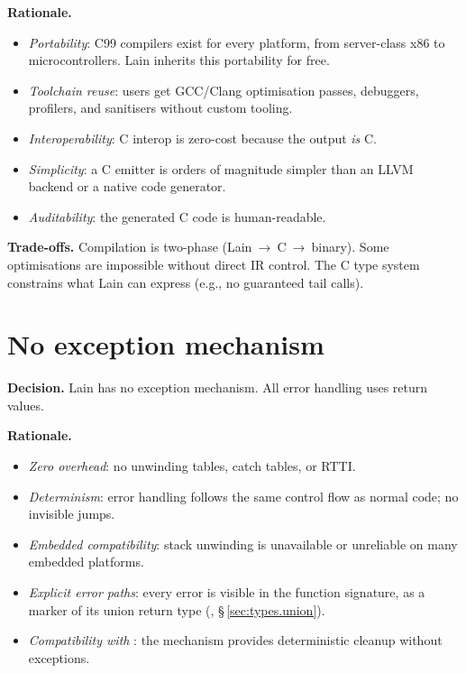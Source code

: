\pnum
\textbf{Rationale.}
\begin{itemize}
  \item \textit{Portability}: C99 compilers exist for every platform,
        from server-class x86 to microcontrollers.  Lain inherits this
        portability for free.
  \item \textit{Toolchain reuse}: users get GCC/Clang optimisation passes,
        debuggers, profilers, and sanitisers without custom tooling.
  \item \textit{Interoperability}: C interop is zero-cost because the
        output \emph{is} C.
  \item \textit{Simplicity}: a C emitter is orders of magnitude simpler
        than an LLVM backend or a native code generator.
  \item \textit{Auditability}: the generated C code is human-readable.
\end{itemize}

\pnum
\textbf{Trade-offs.}  Compilation is two-phase (Lain~→~C~→~binary).
Some optimisations are impossible without direct IR control.  The C type
system constrains what Lain can express (e.g., no guaranteed tail calls).

\section{No exception mechanism}
\label{sec:rationale.no-exceptions}

\pnum
\textbf{Decision.}  Lain has no exception mechanism.  All error handling
uses return values.

\pnum
\textbf{Rationale.}
\begin{itemize}
  \item \textit{Zero overhead}: no unwinding tables, catch tables, or
        RTTI.
  \item \textit{Determinism}: error handling follows the same control
        flow as normal code; no invisible jumps.
  \item \textit{Embedded compatibility}: stack unwinding is unavailable
        or unreliable on many embedded platforms.
  \item \textit{Explicit error paths}: every error is visible in the
        function signature, as a marker of its union return type
        (, \S\,\ref{sec:types.union}).
  \item \textit{Compatibility with }: the 
        mechanism provides deterministic cleanup without exceptions.
\end{itemize}

